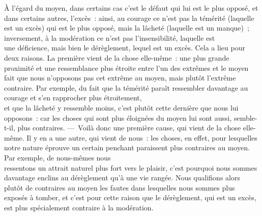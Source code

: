 \documentclass[french,twoside]{book} %
\begin{document}
 À l’égard du moyen, dans certains cas c’est le défaut qui lui est le plus opposé, et dans certains autres, l’excès : ainsi, au courage ce n’est pas la témérité (laquelle est un excès) qui est le plus opposé, mais la lâcheté (laquelle est un manque) ; inversement, à la modération ce n’est pas l’insensibilité, laquelle est \\
une déficience, mais bien le dérèglement, lequel est un excès. Cela a lieu pour deux raisons. La première vient de la chose elle-même : une plus grande proximité et une ressemblance plus étroite entre l’un des extrêmes et le moyen fait que nous n’opposons pas cet extrême au moyen, mais plutôt l’extrême contraire. Par exemple, du fait que la témérité paraît ressembler davantage au courage et s’en rapprocher plus étroitement, \\
et que la lâcheté y ressemble moins, c’est plutôt cette dernière que nous lui opposons : car les choses qui sont plus éloignées du moyen lui sont aussi, semble-t-il, plus contraires. — Voilà donc une première cause, qui vient de la chose elle-même. Il y en a une autre, qui vient de nous : les choses, en effet, pour lesquelles notre nature éprouve un certain penchant paraissent plus contraires au moyen. Par exemple, de nous-mêmes nous \\
ressentons un attrait naturel plus fort vers le plaisir, c’est pourquoi nous sommes davantage enclins au dérèglement qu’à une vie rangée. Nous qualifions alors plutôt de contraires au moyen les fautes dans lesquelles nous sommes plus exposés à tomber, et c’est pour cette raison que le dérèglement, qui est un excès, est plus spécialement contraire à la modération.
\end{document}
